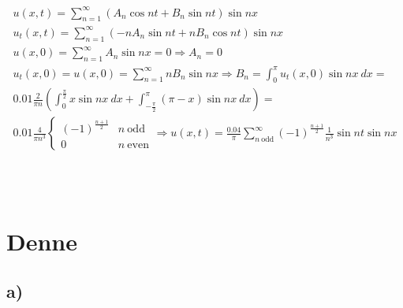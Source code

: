 \begin{gather*}
	u(x, t) = \sum_{n = 1}^\infty{
		\left(
			A_n \cos{n t}
			+
			B_n \sin{n t}
		\right)
		\sin{n x}
	}
	\\
	u_t(x, t) = \sum_{n = 1}^\infty{
		\left(
			-n A_n \sin{n t}
			+
			n B_n \cos{n t}
		\right)
		\sin{n x}
	}
	\\
	u(x, 0) = \sum_{n = 1}^\infty{
		A_n \sin{n x}
	}
	=
	0
	\Rightarrow
	A_n = 0
	\\
	u_t(x, 0) = u(x, 0) = \sum_{n = 1}^\infty{
		n B_n \sin{n x}
	}
	\Rightarrow
	B_n = \int_0^\pi{
		u_t(x, 0) \sin{n x}\ dx
	} =
	\\
	0.01 \frac{2}{\pi n} \left(
		\int_0^{\frac{\pi}{2}}{x \sin{n x}\ dx}
		+
		\int_{-\frac{\pi}{2}}^\pi{(\pi - x) \sin{n x}\ dx}
	\right)
	=
	\\
	0.01 \frac{4}{\pi n^3} \left\{
		\begin{matrix*}
			(-1)^{\frac{n + 1}{2}}	& n\ \text{odd} \\
			0						& n\ \text{even}
		\end{matrix*}
	\right.
	\Rightarrow
	u(x, t) = \frac{0.04}{\pi} \sum_{n\ \text{odd}}^\infty{
		(-1)^{\frac{n + 1}{2}} \frac{1}{n^3} \sin{n t} \sin{n x}
	}
\end{gather*}

\bigskip

\bigskip
\\
\bigskip
\\

\newpage

\section*{Denne}

\subsection*{a)}

